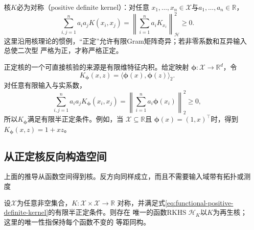 核$K$必为对称（positive definite kernel）：对任意
$x_1,\ldots,x_n\in\mathcal{X}$与$a_1,\ldots,a_n\in\mathbb{R}$，
\begin{equation}
  \sum_{i,j=1}^{n}a_i a_jK(x_i,x_j)
  =
  \left\lVert\sum_{i=1}^{n}a_iK_{x_i}\right\rVert_{\mathcal{H}}^2
  \geq0.
  \label{eq:functional-positive-definite-kernel}
\end{equation}
这里沿用核理论的惯例，“正定”允许有限Gram矩阵奇异；若非零系数和互异输入总使二次型
严格为正，才称严格正定。

正定核的一个可直接核验的来源是有限维特征内积。给定映射
$\bm{\phi}:\mathcal{X}\to\mathbb{R}^d$，令
\[
  K_{\bm{\phi}}(x,z)
  =
  \langle\bm{\phi}(x),\bm{\phi}(z)\rangle_2.
\]
对任意有限输入与实系数，
\[
  \sum_{i,j=1}^{n}a_i a_jK_{\bm{\phi}}(x_i,x_j)
  =
  \left\lVert
    \sum_{i=1}^{n}a_i\bm{\phi}(x_i)
  \right\rVert_2^2
  \geq0,
\]
所以$K_{\bm{\phi}}$满足有限半正定条件。例如，当
$\mathcal{X}\subseteq\mathbb{R}$且
$\bm{\phi}(x)=(1,x)^{\top}$时，得到$K_{\bm{\phi}}(x,z)=1+xz$。

\subsection{从正定核反向构造空间}

上面的推导从函数空间得到核。反方向同样成立，而且不需要输入域带有拓扑或测度

\begin{theorem}[正定核的RKHS构造]
\label{thm:functional-moore-aronszajn-construction}
设$\mathcal{X}$为任意非空集合，$K:\mathcal{X}\times\mathcal{X}\to\mathbb{R}$
对称，并满足式\eqref{eq:functional-positive-definite-kernel}的有限半正定条件。则存在
唯一的函数RKHS $\mathcal{H}_K$以$K$为再生核；这里的唯一性指保持每个函数不变的
等距同构。
\end{theorem}

